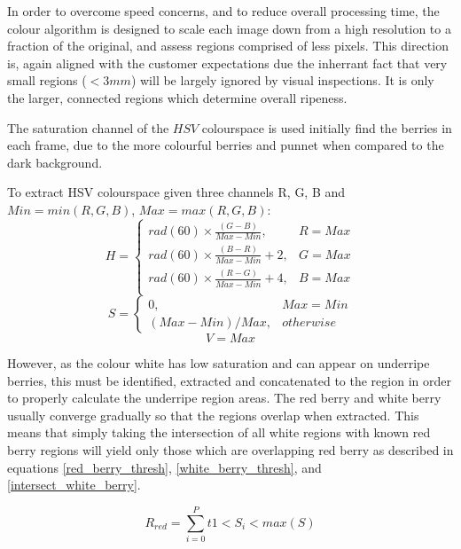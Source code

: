 \documentclass{bmvc2k}
\begin{document}
In order to overcome speed concerns, and to reduce overall processing time, the colour algorithm is designed to scale each image down from a high resolution to a fraction of the original, and assess regions comprised of less pixels. This direction is, again aligned with the customer expectations due the inherrant fact that very small regions ($<3mm$) will be largely ignored by visual inspections. It is only the larger, connected regions which determine overall ripeness.

The saturation channel of the $HSV$ colourspace is used initially find the berries in each frame, due to the more colourful berries and punnet when compared to the dark background. 

To extract HSV colourspace given three channels R, G, B and $Min = min(R, G, B)$, $Max = max(R, G, B)$:
\begin{equation}
H = 
\begin{cases} 
rad(60) \times \frac{(G-B)}{Max-Min}, & R=Max \\
rad(60) \times \frac{(B-R)}{Max-Min} + 2, & G=Max \\
rad(60) \times \frac{(R-G)}{Max-Min} + 4, & B=Max \\   
\end{cases}
\end{equation}
\begin{equation}
S = 
\begin{cases} 
0, & Max=Min \\   
(Max-Min)/Max, & otherwise        
\end{cases}
\end{equation}
\begin{equation}
V = Max
\end{equation}


However, as the colour white has low saturation and can appear on underripe berries, this must be identified, extracted and concatenated to the region in order to properly calculate the underripe region areas. The red berry and white berry usually converge gradually so that the regions overlap when extracted. This means that simply taking the intersection of all white regions with known red berry regions will yield only those which are overlapping red berry as described in equations \ref{red_berry_thresh}, \ref{white_berry_thresh}, and \ref{intersect_white_berry}.

\begin{equation}
R_{red} = \sum_{i=0}^{P}t1<S_i<max(S)
\label{red_berry_thresh}
\end{equation}
\end{document}

